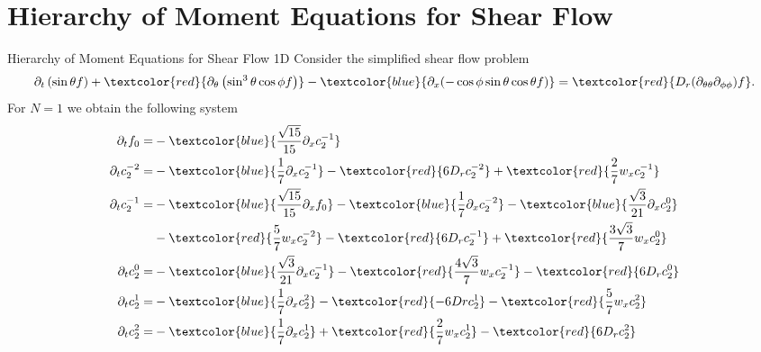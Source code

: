 \section{Hierarchy of Moment Equations for Shear Flow}
\begin{frame}{Hierarchy of Moment Equations for Shear Flow 1D}
	\scriptsize
	Consider the simplified shear flow problem
	\begin{align*}
	\partial_{t}\left(\sin \theta f\right)+ \textcolor{red}{\partial_\theta\left( \sin ^3 \theta \cos \phi f\right)} - \textcolor{blue}{\partial_x(-\cos\phi \sin\theta \cos\theta f)}
	= \textcolor{red}{D_{r}(\partial_{\theta\theta}\partial_{\phi\phi})f}.
	\end{align*}
	For $N=1$ we obtain the following system
	\begin{align*}
		\partial_{t} f_0 = &-\textcolor{blue}{\frac{\sqrt{15}}{15}\partial_x c^{-1}_2}\\
		\partial_{t} c^{-2}_2 = &-\textcolor{blue}{\frac{1}{7} \partial_x c^{-1}_2} -\textcolor{red}{6D_rc^{-2}_2}+ \textcolor{red}{\frac{2}{7}w_xc^{-1}_2} \\
		\partial_{t} c^{-1}_2 = &-\textcolor{blue}{\frac{\sqrt{15}}{15}\partial_x f_0} - \textcolor{blue}{\frac{1}{7} \partial_x c^{-2}_2} - \textcolor{blue}{\frac{\sqrt{3}}{21}\partial_x c^0_2} \\ &-\textcolor{red}{\frac{5}{7}w_x c^{-2}_2} -\textcolor{red}{6D_r c^{-1}_2} +\textcolor{red}{\frac{3\sqrt{3}}{7}w_x c^0_2} \\
		\partial_{t} c^0_2 = &-\textcolor{blue}{\frac{\sqrt{3}}{21}\partial_x c^{-1}_2} -\textcolor{red}{\frac{4\sqrt{3}}{7}w_x c^{-1}_2} -\textcolor{red}{6D_r c^0_2} \\
		\partial_{t} c^1_2 = &-\textcolor{blue}{\frac{1}{7}\partial_x c^2_2} -\textcolor{red}{-6Dr c^{1}_2} -\textcolor{red}{\frac{5}{7}w_x c^{2}_2}\\
		\partial_{t} c^2_2 = &-\textcolor{blue}{\frac{1}{7}\partial_x c^1_2} +\textcolor{red}{\frac{2}{7}w_x c^{1}_2} -\textcolor{red}{6D_r c^{2}_2}
	\end{align*}
\end{frame}

